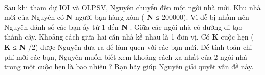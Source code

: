  

Sau khi tham dự IOI và OLPSV, Nguyên chuyển đến một ngôi nhà mới. Khu nhà mới của Nguyên có \textbf{ N } người bạn hàng xóm ( \textbf{ N } ≤ 200000). Vì dễ bị nhầm nên Nguyên đánh số các bạn ấy từ 1 đến \textbf{ N } . Giữa các ngôi nhà có đường đi tạo thành cây. Khoảng cách giữa hai căn nhà kề nhau là 1 đơn vị. Có \textbf{ K } cuộc hẹn ( \textbf{ K } ≤ \textbf{ N } /2) được Nguyên đưa ra để làm quen với các bạn mới. Để tính toán chi phí mời các bạn, Nguyên muốn biết xem khoảng cách xa nhất của 2 ngôi nhà trong một cuộc hẹn là bao nhiêu ? Bạn hãy giúp Nguyên giải quyết vấn đề này.

\